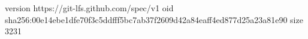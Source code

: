 version https://git-lfs.github.com/spec/v1
oid sha256:00e14ebe1dfe70f3c5ddfff5bc7ab37f2609d42a84eaff4ed877d25a23a81e90
size 3231
